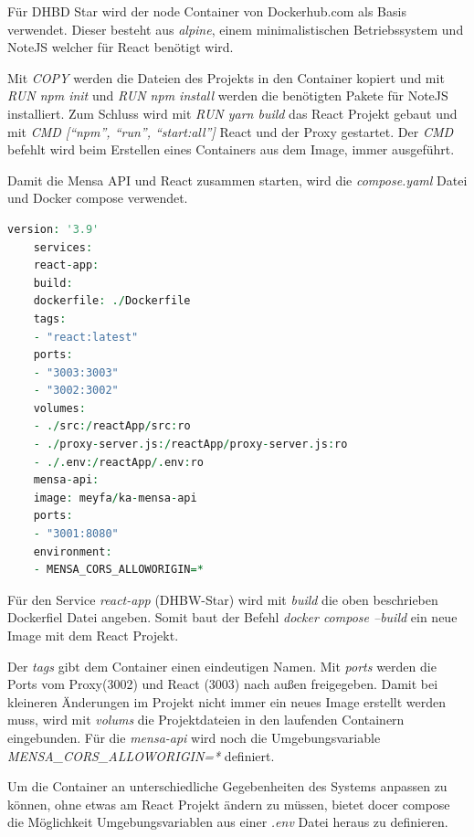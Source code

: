 Für DHBD Star wird der node Container von Dockerhub.com als Basis verwendet. Dieser besteht aus \emph{alpine}, einem minimalistischen Betriebssystem und NoteJS welcher für React benötigt wird.

Mit \emph{COPY} werden die Dateien des Projekts in den Container kopiert und mit \emph{RUN npm init} und \emph{RUN npm install} werden die benötigten Pakete für NoteJS installiert.
Zum Schluss wird mit \emph{RUN yarn build} das React Projekt gebaut und mit \emph{CMD ["`npm"', "`run"', "`start:all"']} React und der Proxy gestartet. Der \emph{CMD} befehlt wird beim Erstellen eines Containers aus dem Image, immer ausgeführt. 

Damit die Mensa API und React zusammen starten, wird die \emph{compose.yaml} Datei und Docker compose verwendet.

\begin{lstlisting}[language=vhdl,
	frame=single,           % Ein Rahmen um den Code
	framexleftmargin=15pt,  % Rahmen link von den Zahlen
	style=algoBericht,
	label={composefile},
	captionpos=b           % Caption unter den Code setzen
	caption={compose.yaml für DHBW-Star}]
	version: '3.9'
	services:
	react-app:
	build:
	dockerfile: ./Dockerfile
	tags:
	- "react:latest"
	ports:
	- "3003:3003"
	- "3002:3002"
	volumes:
	- ./src:/reactApp/src:ro
	- ./proxy-server.js:/reactApp/proxy-server.js:ro
	- ./.env:/reactApp/.env:ro
	mensa-api:
	image: meyfa/ka-mensa-api
	ports:
	- "3001:8080"
	environment:
	- MENSA_CORS_ALLOWORIGIN=*
\end{lstlisting}

Für den Service \emph{react-app} (DHBW-Star) wird mit \emph{build} die oben beschrieben Dockerfiel Datei angeben. Somit baut der Befehl \emph{docker compose --build} ein neue Image mit dem React Projekt.

Der \emph{tags} gibt dem Container einen eindeutigen Namen.
Mit \emph{ports} werden die Ports vom Proxy(3002) und React (3003) nach außen freigegeben.
Damit bei kleineren Änderungen im Projekt nicht immer ein neues Image erstellt werden muss, wird mit \emph{volums} die Projektdateien in den laufenden Containern eingebunden.
Für die \emph{mensa-api} wird noch die Umgebungsvariable \emph{MENSA\_CORS\_ALLOWORIGIN=*} definiert.

Um die Container an unterschiedliche Gegebenheiten des Systems anpassen zu können, ohne etwas am React Projekt ändern zu müssen, bietet docer compose die Möglichkeit Umgebungsvariablen aus einer \emph{.env} Datei heraus zu definieren.

